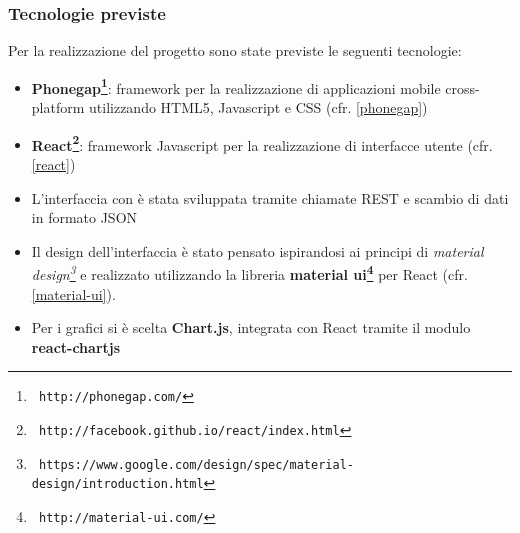 \subsubsection{Tecnologie previste}
Per la realizzazione del progetto sono state previste le seguenti tecnologie:

\begin{itemize}
\item \textbf{Phonegap\footnote{\texttt{ http://phonegap.com/}}}: framework per 
la realizzazione di applicazioni mobile
cross-platform utilizzando HTML5, Javascript e CSS (cfr. \ref{phonegap})
\item \textbf{React\footnote{\texttt{ http://facebook.github.io/react/index.html}}}: 
framework Javascript per la realizzazione di interfacce utente (cfr. \ref{react})
\item L'interfaccia con \fiscoloWeb{} è stata sviluppata tramite chiamate REST e
scambio di dati in formato JSON
\item Il design dell'interfaccia è stato pensato ispirandosi ai principi di
\textit{material design\footnote{\texttt{ https://www.google.com/design/spec/material-design/introduction.html}}} e 
realizzato utilizzando la libreria \textbf{material ui\footnote{\texttt{ http://material-ui.com/}}} per React (cfr. \ref{material-ui}).
\item Per i grafici si è scelta \textbf{Chart.js}, integrata con React tramite
il modulo \textbf{react-chartjs}
\end{itemize}

